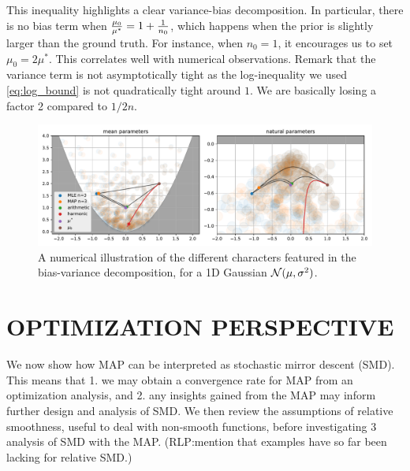 \documentclass[twoside]{article}
\let\oldsection\section
\renewcommand{\section}[1]{\oldsection{\texorpdfstring{\uppercase{#1}}{#1}}}
\newcommand{\rlp}[1]{\textcolor{BrickRed}{(RLP:#1)}}
\newcommand{\m}{\mu}
\begin{document}
This inequality highlights a clear variance-bias decomposition.
In particular, there is no bias term when $\frac{\m_0}{\m^*} =1 + \inv{n_0} $, which happens when the prior is slightly larger than the ground truth.  For instance, when $n_0=1$, it encourages us to set $\m_0 = 2 \m^*$. This correlates well with numerical observations.
Remark that the variance term is not asymptotically tight as the log-inequality we used \eqref{eq:log_bound} is not quadratically tight around $1$. We are basically losing a factor 2 compared to $1/2n$.


\begin{figure}[t]
	\centering
	\includegraphics[width=\textwidth]{figs/thales/numerical_schema_n=3.pdf}
	\caption{A numerical illustration of the different characters featured in the bias-variance decomposition, for a 1D Gaussian ${\mathcal N}(\mu, \sigma^2)$.}
	\label{fig:bias-variance-numerical}
\end{figure}


\section{Optimization Perspective}
\label{sec:optimization}

We now show how MAP can be interpreted as stochastic mirror descent (SMD).
This means that 1. we may obtain a convergence rate for MAP from an optimization analysis, and 2. any insights gained from the MAP may inform further design and analysis of SMD.
We then review the assumptions of relative smoothness, useful to deal with non-smooth functions, before investigating 3 analysis of SMD with the MAP.
\rlp{mention that examples have so far been lacking for relative SMD.}
\end{document}
